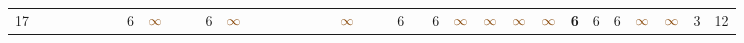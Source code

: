 \begin{landscape}
\begin{table}
\begin{adjustwidth}{-2.6cm}{}
{\begin{tabular}{l|lllllllllllllllllllllllllllllllll|ll}
		17   &            &                                                                 &                                                                 &                                                                 &                                                                 &                                                                 & 6                                                               & $\textcolor[rgb]{0.541,0.29,0.043}{\infty}$ &                                                                 &                                                                 & 6                                                               & $\textcolor[rgb]{0.541,0.29,0.043}{\infty}$ &                                                                 &                                                                 &                                                                 &                                                                 &                                                                 &                                                                 & $\textcolor[rgb]{0.541,0.29,0.043}{\infty}$ &                                                                 &                                                                 & 6                                                               &                                                                 & 6                                                               & $\textcolor[rgb]{0.541,0.29,0.043}{\infty}$ & $\textcolor[rgb]{0.541,0.29,0.043}{\infty}$ & $\textcolor[rgb]{0.541,0.29,0.043}{\infty}$ & $\textcolor[rgb]{0.541,0.29,0.043}{\infty}$ & \textbf{6}                                                      & 6                                                               & 6                                                               & $\textcolor[rgb]{0.541,0.29,0.043}{\infty}$ & $\textcolor[rgb]{0.541,0.29,0.043}{\infty}$ & 3          & 12          \\

\end{tabular}}
\end{adjustwidth}
\end{table}
\end{landscape}
